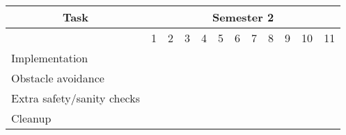 \documentclass{article}
\begin{document}
\begin{tabular}{@{}llllllllllll@{}}
\toprule
\multicolumn{1}{c}{Task} & \multicolumn{11}{c}{Semester 2} \\ \midrule
 & 1 & 2 & 3 & 4 & 5 & 6 & 7 & 8 & 9 & 10 & 11 \\ \midrule
Implementation & \multicolumn{11}{l}{} \\ \midrule
\indent Obstacle avoidance & \cellcolor[HTML]{34FF34} & \cellcolor[HTML]{34FF34} & \cellcolor[HTML]{34FF34} & \cellcolor[HTML]{34FF34} &  &  &  &  &  &  &  \\ \midrule
\indent Extra safety/sanity checks &  &  &  &  & \cellcolor[HTML]{34FF34}{\color[HTML]{000000} } & \cellcolor[HTML]{34FF34}{\color[HTML]{000000} } &  &  &  &  &  \\ \midrule
Cleanup &  &  &  &  &  & \cellcolor[HTML]{34FF34} & \cellcolor[HTML]{34FF34} & \cellcolor[HTML]{34FF34} & \cellcolor[HTML]{34FF34} & \cellcolor[HTML]{34FF34} & \cellcolor[HTML]{34FF34} \\ \bottomrule
\end{tabular}
\end{document}
